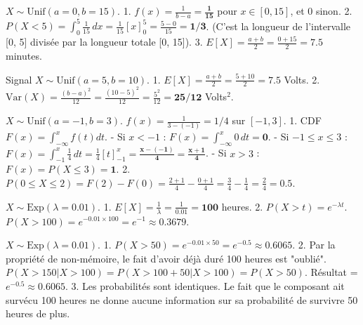 
\begin{correctionbox}
$X \sim \text{Unif}(a=0, b=15)$.
1.  $f(x) = \frac{1}{b-a} = \mathbf{\frac{1}{15}}$ pour $x \in [0, 15]$, et 0 sinon.
2.  $P(X < 5) = \int_0^5 \frac{1}{15} \, dx = \frac{1}{15} [x]_0^5 = \frac{5-0}{15} = \mathbf{1/3}$.
    (C'est la longueur de l'intervalle [0, 5] divisée par la longueur totale [0, 15]).
3.  $E[X] = \frac{a+b}{2} = \frac{0+15}{2} = \mathbf{7.5}$ minutes.
\end{correctionbox}

\begin{correctionbox}
Signal $X \sim \text{Unif}(a=5, b=10)$.
1.  $E[X] = \frac{a+b}{2} = \frac{5+10}{2} = \mathbf{7.5}$ Volts.
2.  $\text{Var}(X) = \frac{(b-a)^2}{12} = \frac{(10-5)^2}{12} = \frac{5^2}{12} = \mathbf{25/12}$ Volts$^2$.
\end{correctionbox}

\begin{correctionbox}
$X \sim \text{Unif}(a=-1, b=3)$. $f(x) = \frac{1}{3 - (-1)} = 1/4$ sur $[-1, 3]$.
1.  CDF $F(x) = \int_{-\infty}^x f(t) dt$.
    - Si $x < -1$ : $F(x) = \int_{-\infty}^x 0 \, dt = \mathbf{0}$.
    - Si $-1 \le x \le 3$ : $F(x) = \int_{-1}^x \frac{1}{4} \, dt = \frac{1}{4}[t]_{-1}^x = \mathbf{\frac{x - (-1)}{4} = \frac{x+1}{4}}$.
    - Si $x > 3$ : $F(x) = P(X \le 3) = \mathbf{1}$.
2.  $P(0 \le X \le 2) = F(2) - F(0) = \frac{2+1}{4} - \frac{0+1}{4} = \frac{3}{4} - \frac{1}{4} = \frac{2}{4} = \mathbf{0.5}$.
\end{correctionbox}


\begin{correctionbox}
$X \sim \text{Exp}(\lambda = 0.01)$.
1.  $E[X] = \frac{1}{\lambda} = \frac{1}{0.01} = \mathbf{100}$ heures.
2.  $P(X > t) = e^{-\lambda t}$.
    $P(X > 100) = e^{-0.01 \times 100} = e^{-1} \approx \mathbf{0.3679}$.
\end{correctionbox}

\begin{correctionbox}
$X \sim \text{Exp}(\lambda = 0.01)$.
1.  $P(X > 50) = e^{-0.01 \times 50} = e^{-0.5} \approx \mathbf{0.6065}$.
2.  Par la propriété de non-mémoire, le fait d'avoir déjà duré 100 heures est "oublié".
    $P(X > 150 | X > 100) = P(X > 100 + 50 | X > 100) = P(X > 50)$.
    Résultat = $e^{-0.5} \approx \mathbf{0.6065}$.
3.  Les probabilités sont identiques. Le fait que le composant ait survécu 100 heures ne donne aucune information sur sa probabilité de survivre 50 heures de plus.
\end{correctionbox}

